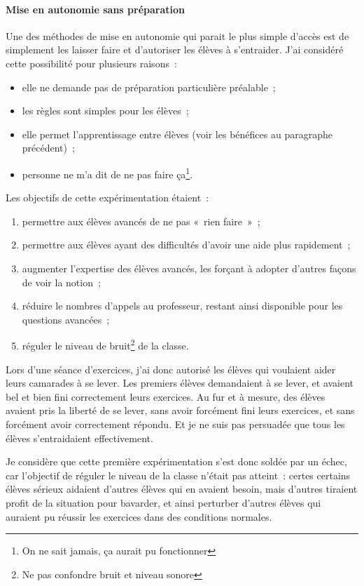 \paragraph{Mise en autonomie sans préparation}

Une des méthodes de mise en autonomie qui parait le plus simple d'accès est de
simplement les laisser faire et d'autoriser les élèves à s'entraider. J'ai
considéré cette possibilité pour plusieurs raisons :
\begin{itemize}
    \item elle ne demande pas de préparation particulière préalable ;
    \item les règles sont simples pour les élèves ;
    \item elle permet l'apprentissage entre élèves (voir les bénéfices au paragraphe précédent) ;
    \item personne ne m'a dit de ne pas faire ça\footnote{On ne sait jamais, ça aurait pu fonctionner}.
\end{itemize}

Les objectifs de cette expérimentation étaient :
\begin{enumerate}
    \item permettre aux élèves avancés de ne pas « rien faire » ;
    \item permettre aux élèves ayant des difficultés d'avoir une aide plus
    rapidement ;
    \item augmenter l'expertise des élèves avancés, les forçant à adopter d'autres
    façons de voir la notion ;
    \item réduire le nombres d'appels au professeur, restant ainsi disponible
    pour les questions avancées ;
    \item réguler le niveau de bruit\footnote{Ne pas confondre bruit et niveau sonore} de la classe.
\end{enumerate}

Lors d'une séance d'exercices, j'ai donc autorisé les élèves qui voulaient
aider leurs camarades à se lever. Les premiers élèves demandaient à se lever, et
avaient bel et bien fini correctement leurs exercices. Au fur et à mesure, des
élèves avaient pris la liberté de se lever, sans avoir forcément fini leurs exercices,
et sans forcément avoir correctement répondu. Et je ne suis pas persuadée que
tous les élèves s'entraidaient effectivement.

Je considère que cette première expérimentation s'est donc soldée par un échec, car
l'objectif de réguler le niveau de la classe n'était pas atteint : certes certains
élèves sérieux aidaient d'autres élèves qui en avaient besoin, mais d'autres tiraient
profit de la situation pour bavarder, et ainsi perturber d'autres élèves qui
auraient pu réussir les exercices dans des conditions normales.

